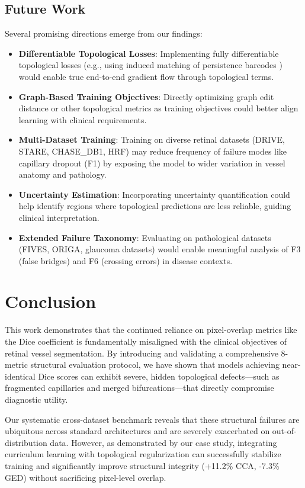 \documentclass[conference]{IEEEtran}
\begin{document}
\subsection{Future Work}
Several promising directions emerge from our findings:
\begin{itemize}
    \item \textbf{Differentiable Topological Losses}: Implementing fully differentiable topological losses (e.g., using induced matching of persistence barcodes \cite{stucki2023topologically}) would enable true end-to-end gradient flow through topological terms.
    \item \textbf{Graph-Based Training Objectives}: Directly optimizing graph edit distance or other topological metrics as training objectives could better align learning with clinical requirements.
    \item \textbf{Multi-Dataset Training}: Training on diverse retinal datasets (DRIVE, STARE, CHASE\_DB1, HRF) may reduce frequency of failure modes like capillary dropout (F1) by exposing the model to wider variation in vessel anatomy and pathology.
    \item \textbf{Uncertainty Estimation}: Incorporating uncertainty quantification could help identify regions where topological predictions are less reliable, guiding clinical interpretation.
    \item \textbf{Extended Failure Taxonomy}: Evaluating on pathological datasets (FIVES, ORIGA, glaucoma datasets) would enable meaningful analysis of F3 (false bridges) and F6 (crossing errors) in disease contexts.
\end{itemize}

\section{Conclusion}
This work demonstrates that the continued reliance on pixel-overlap metrics like the Dice coefficient is fundamentally misaligned with the clinical objectives of retinal vessel segmentation. By introducing and validating a comprehensive 8-metric structural evaluation protocol, we have shown that models achieving near-identical Dice scores can exhibit severe, hidden topological defects—such as fragmented capillaries and merged bifurcations—that directly compromise diagnostic utility. 

Our systematic cross-dataset benchmark reveals that these structural failures are ubiquitous across standard architectures and are severely exacerbated on out-of-distribution data. However, as demonstrated by our case study, integrating curriculum learning with topological regularization can successfully stabilize training and significantly improve structural integrity (+11.2\% CCA, -7.3\% GED) without sacrificing pixel-level overlap. 
\end{document}

